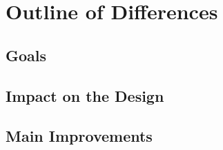 \chapter{Outline of Differences}

\section{Goals}

\section{Impact on the Design}

\section{Main Improvements}
